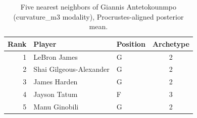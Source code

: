 \begin{table}[htbp]
  \centering\small
  \begin{tabular}{rllc}
    \toprule
    Rank & Player & Position & Archetype \\
    \midrule
    1 & LeBron James & G & 2 \\
    2 & Shai Gilgeous-Alexander & G & 2 \\
    3 & James Harden & G & 2 \\
    4 & Jayson Tatum & F & 3 \\
    5 & Manu Ginobili & G & 2 \\
    \bottomrule
  \end{tabular}
  \caption{Five nearest neighbors of Giannis Antetokounmpo (curvature_m3 modality), Procrustes-aligned posterior mean.}
  \label{tab:Giannis_Antetokounmpo_neighbors_curvature_m3}
\end{table}

